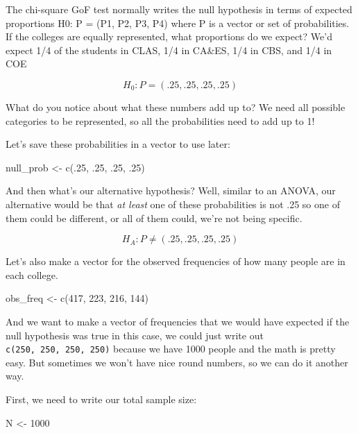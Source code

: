 \documentclass[
  letterpaper,
  DIV=11,
  numbers=noendperiod]{scrartcl}
\newenvironment{Shaded}{\begin{snugshade}}{\end{snugshade}}
\newcommand{\DecValTok}[1]{\textcolor[rgb]{0.68,0.00,0.00}{#1}}
\newcommand{\FunctionTok}[1]{\textcolor[rgb]{0.28,0.35,0.67}{#1}}
\newcommand{\NormalTok}[1]{\textcolor[rgb]{0.00,0.23,0.31}{#1}}
\newcommand{\OtherTok}[1]{\textcolor[rgb]{0.00,0.23,0.31}{#1}}
\begin{document}
The chi-square GoF test normally writes the null hypothesis in terms of
expected proportions H0: P = (P1, P2, P3, P4) where P is a vector or set
of probabilities. If the colleges are equally represented, what
proportions do we expect? We'd expect 1/4 of the students in CLAS, 1/4
in CA\&ES, 1/4 in CBS, and 1/4 in COE

\[
H_0: P = (.25, .25, .25, .25)
\]

What do you notice about what these numbers add up to? We need all
possible categories to be represented, so all the probabilities need to
add up to 1!

Let's save these probabilities in a vector to use later:

\begin{Shaded}
\begin{Highlighting}[]
\NormalTok{null\_prob }\OtherTok{\textless{}{-}} \FunctionTok{c}\NormalTok{(.}\DecValTok{25}\NormalTok{, .}\DecValTok{25}\NormalTok{, .}\DecValTok{25}\NormalTok{, .}\DecValTok{25}\NormalTok{)}
\end{Highlighting}
\end{Shaded}

And then what's our alternative hypothesis? Well, similar to an ANOVA,
our alternative would be that \emph{at least} one of these probabilities
is not .25 so one of them could be different, or all of them could,
we're not being specific.

\[
H_A: P \neq (.25, .25, .25, .25)
\]

Let's also make a vector for the observed frequencies of how many people
are in each college.

\begin{Shaded}
\begin{Highlighting}[]
\NormalTok{obs\_freq }\OtherTok{\textless{}{-}} \FunctionTok{c}\NormalTok{(}\DecValTok{417}\NormalTok{, }\DecValTok{223}\NormalTok{, }\DecValTok{216}\NormalTok{, }\DecValTok{144}\NormalTok{)}
\end{Highlighting}
\end{Shaded}

And we want to make a vector of frequencies that we would have expected
if the null hypothesis was true in this case, we could just write out
\texttt{c(250,\ 250,\ 250,\ 250)} because we have 1000 people and the
math is pretty easy. But sometimes we won't have nice round numbers, so
we can do it another way.

First, we need to write our total sample size:

\begin{Shaded}
\begin{Highlighting}[]
\NormalTok{N }\OtherTok{\textless{}{-}} \DecValTok{1000}
\end{Highlighting}
\end{Shaded}
\end{document}
